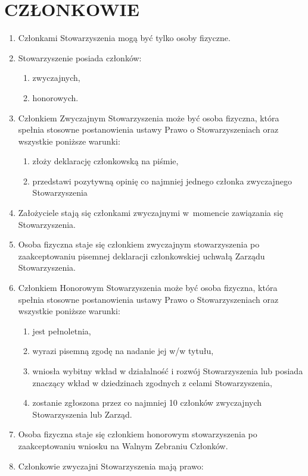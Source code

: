 \documentclass{article}
\begin{document}
\section{CZŁONKOWIE}
  \begin{enumerate}
    \item Członkami Stowarzyszenia mogą być tylko osoby fizyczne.
    \item Stowarzyszenie posiada członków:
      \begin{enumerate}
        \item zwyczajnych,
        \item honorowych.
      \end{enumerate}
    \item Członkiem Zwyczajnym Stowarzyszenia może być osoba fizyczna, która spełnia stosowne postanowienia ustawy Prawo o Stowarzyszeniach oraz wszystkie poniższe warunki:
      \begin{enumerate}
        \item złoży deklarację członkowską na piśmie,
        \item przedstawi pozytywną opinię co najmniej jednego członka zwyczajnego Stowarzyszenia
      \end{enumerate}
    \item Założyciele stają się członkami zwyczajnymi w~momencie zawiązania się Stowarzyszenia.
    \item Osoba fizyczna staje się członkiem zwyczajnym stowarzyszenia po zaakceptowaniu pisemnej deklaracji członkowskiej uchwałą Zarządu Stowarzyszenia.
    \item Członkiem Honorowym Stowarzyszenia może być osoba fizyczna, która spełnia stosowne postanowienia ustawy Prawo o Stowarzyszeniach oraz wszystkie poniższe warunki:
      \begin{enumerate}
        \item jest pełnoletnia,
        \item wyrazi pisemną zgodę na nadanie jej w/w tytułu,
        \item wniosła wybitny wkład w działalność i rozwój Stowarzyszenia lub posiada znaczący wkład w dziedzinach zgodnych z celami Stowarzyszenia,
        \item zostanie zgłoszona przez co najmniej 10 członków zwyczajnych Stowarzyszenia lub Zarząd.
      \end{enumerate}
    \item Osoba fizyczna staje się członkiem honorowym stowarzyszenia po zaakceptowaniu wniosku na Walnym Zebraniu Członków.
    \item Członkowie zwyczajni Stowarzyszenia mają prawo:

\end{enumerate}
\end{document}
